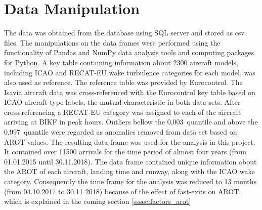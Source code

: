 \section{Data Manipulation}
The data was obtained from the database using SQL server and stored as csv files. The manipulations on the data frames were performed using the functionality of Pandas and NumPy data analysis tools and computing packages for Python. A key table containing information about 2300 aircraft models, including ICAO and RECAT-EU wake turbulence categories for each model, was also used as reference. 
The reference table was provided by Eurocontrol. 
The Isavia aircraft data was cross-referenced with the Eurocontrol key table based on ICAO aircraft type labels, the mutual characteristic in both data sets. 
After cross-referencing a RECAT-EU category was assigned to each of the aircraft arriving at BIKF in peak hours. Outliers bellow the 0,003~quantile and above the 0,997~quantile were regarded as anomalies removed from data set based on AROT values. 
The resulting data frame was used for the analysis in this project. 
It contained over 11500 arrivals for the time period of almost four years (from 01.01.2015 until 30.11.2018). The data frame contained unique information about the AROT of each aircraft, landing time and runway, along with the ICAO wake category. Consequently the time frame for the analysis was reduced to 13 months (from 04.10.2017 to 30.11 2018) because of the effect of fast-exits on AROT, which is explained in the coming section \ref{sssec:factors_arot}


